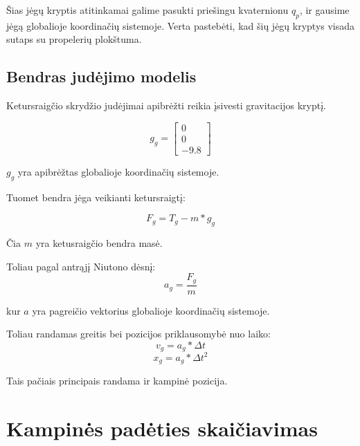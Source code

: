\documentclass[12pt, a4paper, lithuanian, final]{article}
\begin{document}
Šias jėgų kryptis atitinkamai galime pasukti priešingu kvaternionu $q_{p}$, ir gausime jėgą globalioje koordinačių sistemoje.
Verta pastebėti, kad šių jėgų kryptys visada sutaps su propelerių plokštuma.

\subsection{Bendras judėjimo modelis}

Ketursraigčio skrydžio judėjimai apibrėžti reikia įsivesti gravitacijos kryptį.

\begin{equation}
	g_{g} =  \left[
		\begin{array}{c}
			0 \\
			0 \\
			-9.8
		\end{array}
	\right]
\end{equation}

$g_{g}$ yra apibrėžtas globalioje koordinačių sistemoje.

Tuomet bendra jėga veikianti ketursraigtį:

\begin{equation}
	F_{g} = T_{g} - m*g_{g}
\end{equation}

Čia $m$  yra ketusraigčio bendra masė.

Toliau pagal antrąjį Niutono dėsnį:
\begin{equation}
	a_{g} = \dfrac{F_{g}}{m}
\end{equation}

kur $a$ yra pagreičio vektorius globalioje koordinačių sistemoje.

Toliau randamas greitis bei pozicijos priklausomybė nuo laiko:
\begin{equation}
	v_{g} = a_{g} * \Delta t
\end{equation}
\begin{equation}
	x_{g} = a_{g} * \Delta t ^2
\end{equation}

Tais pačiais principais randama ir kampinė pozicija.







\section{Kampinės padėties skaičiavimas}
\label{skyr-attitude}
\end{document}

